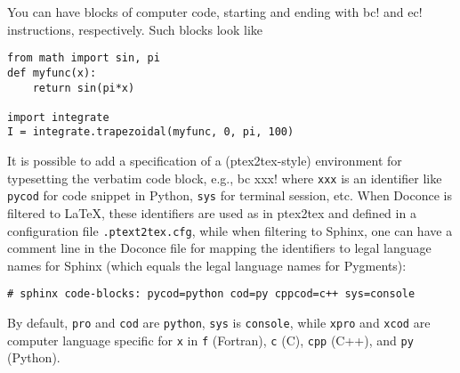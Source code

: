 \documentclass{article}
\begin{document}
You can have blocks of computer code, starting and ending with
{\fontsize{10pt}{10pt}\verb!!bc!} and {\fontsize{10pt}{10pt}\verb!!ec!} instructions, respectively. Such blocks look like
\providecommand{\shadedskip}{}
\renewenvironment{shadedskip}{
\def\FrameCommand{\colorbox{shadecolor}}\FrameRule0.6pt
\MakeFramed {\FrameRestore}\vskip3mm}{\vskip0mm\endMakeFramed}
\providecommand{\shadedquoteBlue}{}
\renewenvironment{shadedquoteBlue}[1][]{
\bgroup\rmfamily
\fboxsep=0mm\relax
\begin{shadedskip}
\list{}{\parsep=-2mm\parskip=0mm\topsep=0pt\leftmargin=2mm
\rightmargin=2\leftmargin\leftmargin=4pt\relax}
\item\relax}
{\endlist\end{shadedskip}\egroup}\begin{shadedquoteBlue}
\fontsize{9pt}{9pt}
\begin{Verbatim}
from math import sin, pi
def myfunc(x):
    return sin(pi*x)

import integrate
I = integrate.trapezoidal(myfunc, 0, pi, 100)
\end{Verbatim}
\end{shadedquoteBlue}
\noindent
It is possible to add a specification of a (ptex2tex-style)
environment for typesetting the verbatim code block, e.g., {\fontsize{10pt}{10pt}\verb!!bc xxx!}
where {\fontsize{10pt}{10pt}\verb!xxx!} is an identifier like {\fontsize{10pt}{10pt}\verb!pycod!} for code snippet in Python,
{\fontsize{10pt}{10pt}\verb!sys!} for terminal session, etc. When Doconce is filtered to {\LaTeX},
these identifiers are used as in ptex2tex and defined in a
configuration file {\fontsize{10pt}{10pt}\verb!.ptext2tex.cfg!}, while when filtering
to Sphinx, one can have a comment line in the Doconce file for
mapping the identifiers to legal language names for Sphinx (which equals
the legal language names for Pygments):
\begin{Verbatim}[fontsize=\fontsize{9pt}{9pt},tabsize=8,baselinestretch=0.85,
fontfamily=tt,xleftmargin=7mm]
# sphinx code-blocks: pycod=python cod=py cppcod=c++ sys=console
\end{Verbatim}
\noindent
By default, {\fontsize{10pt}{10pt}\verb!pro!} and {\fontsize{10pt}{10pt}\verb!cod!} are {\fontsize{10pt}{10pt}\verb!python!}, {\fontsize{10pt}{10pt}\verb!sys!} is {\fontsize{10pt}{10pt}\verb!console!},
while {\fontsize{10pt}{10pt}\verb!xpro!} and {\fontsize{10pt}{10pt}\verb!xcod!} are computer language specific for {\fontsize{10pt}{10pt}\verb!x!}
in {\fontsize{10pt}{10pt}\verb!f!} (Fortran), {\fontsize{10pt}{10pt}\verb!c!} (C), {\fontsize{10pt}{10pt}\verb!cpp!} (C++), and {\fontsize{10pt}{10pt}\verb!py!} (Python).
\end{document}
